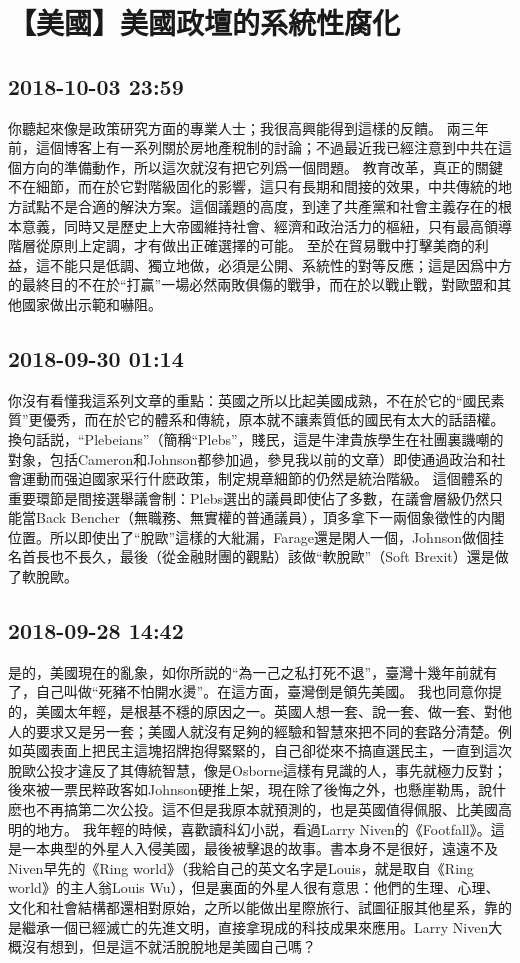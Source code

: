 \documentclass[twocolumn]{ctexart}
\begin{document}
\section*{【美國】美國政壇的系統性腐化}
\subsection*{2018-10-03 23:59}

你聽起來像是政策研究方面的專業人士；我很高興能得到這樣的反饋。
兩三年前，這個博客上有一系列關於房地產稅制的討論；不過最近我已經注意到中共在這個方向的準備動作，所以這次就沒有把它列爲一個問題。
教育改革，真正的關鍵不在細節，而在於它對階級固化的影響，這只有長期和間接的效果，中共傳統的地方試點不是合適的解決方案。這個議題的高度，到達了共產黨和社會主義存在的根本意義，同時又是歷史上大帝國維持社會、經濟和政治活力的樞紐，只有最高領導階層從原則上定調，才有做出正確選擇的可能。
至於在貿易戰中打擊美商的利益，這不能只是低調、獨立地做，必須是公開、系統性的對等反應；這是因爲中方的最終目的不在於“打贏”一場必然兩敗俱傷的戰爭，而在於以戰止戰，對歐盟和其他國家做出示範和嚇阻。
\subsection*{2018-09-30 01:14}

你沒有看懂我這系列文章的重點：英國之所以比起美國成熟，不在於它的“國民素質”更優秀，而在於它的體系和傳統，原本就不讓素質低的國民有太大的話語權。換句話説，“Plebeians”（簡稱“Plebs”，賤民，這是牛津貴族學生在社團裏譏嘲的對象，包括Cameron和Johnson都參加過，參見我以前的文章）即使通過政治和社會運動而强迫國家采行什麽政策，制定規章細節的仍然是統治階級。
這個體系的重要環節是間接選舉議會制：Plebs選出的議員即使佔了多數，在議會層級仍然只能當Back Bencher（無職務、無實權的普通議員），頂多拿下一兩個象徵性的内閣位置。所以即使出了“脫歐”這樣的大紕漏，Farage還是閑人一個，Johnson做個挂名首長也不長久，最後（從金融財團的觀點）該做“軟脫歐”（Soft Brexit）還是做了軟脫歐。
\subsection*{2018-09-28 14:42}

是的，美國現在的亂象，如你所説的“為一己之私打死不退”，臺灣十幾年前就有了，自己叫做“死豬不怕開水燙”。在這方面，臺灣倒是領先美國。
我也同意你提的，美國太年輕，是根基不穩的原因之一。英國人想一套、說一套、做一套、對他人的要求又是另一套；美國人就沒有足夠的經驗和智慧來把不同的套路分清楚。例如英國表面上把民主這塊招牌抱得緊緊的，自己卻從來不搞直選民主，一直到這次脫歐公投才違反了其傳統智慧，像是Osborne這樣有見識的人，事先就極力反對；後來被一票民粹政客如Johnson硬推上架，現在除了後悔之外，也懸崖勒馬，說什麽也不再搞第二次公投。這不但是我原本就預測的，也是英國值得佩服、比美國高明的地方。
我年輕的時候，喜歡讀科幻小説，看過Larry Niven的《Footfall》。這是一本典型的外星人入侵美國，最後被擊退的故事。書本身不是很好，遠遠不及Niven早先的《Ring world》（我給自己的英文名字是Louis，就是取自《Ring world》的主人翁Louis Wu），但是裏面的外星人很有意思：他們的生理、心理、文化和社會結構都還相對原始，之所以能做出星際旅行、試圖征服其他星系，靠的是繼承一個已經滅亡的先進文明，直接拿現成的科技成果來應用。Larry Niven大概沒有想到，但是這不就活脫脫地是美國自己嗎？
\end{document}
